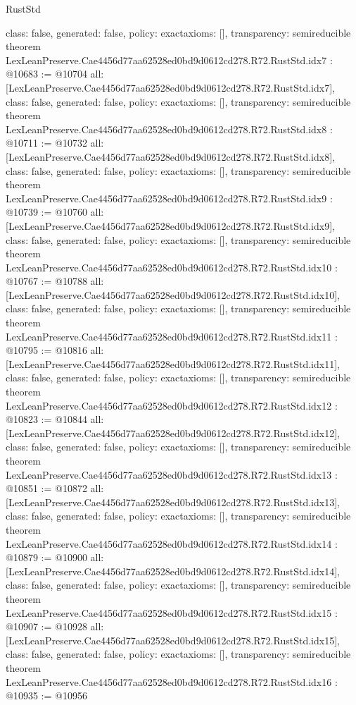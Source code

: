 \begin{lexlean}{RustStd}
\begin{coremodule}
{  class: false,
  generated: false,
  policy: exact{axioms: []},
  transparency: semireducible
}
theorem LexLeanPreserve.Cae4456d77aa62528ed0bd9d0612cd278.R72.RustStd.idx7 : @10683 := @10704 {
  all: [LexLeanPreserve.Cae4456d77aa62528ed0bd9d0612cd278.R72.RustStd.idx7],
  class: false,
  generated: false,
  policy: exact{axioms: []},
  transparency: semireducible
}
theorem LexLeanPreserve.Cae4456d77aa62528ed0bd9d0612cd278.R72.RustStd.idx8 : @10711 := @10732 {
  all: [LexLeanPreserve.Cae4456d77aa62528ed0bd9d0612cd278.R72.RustStd.idx8],
  class: false,
  generated: false,
  policy: exact{axioms: []},
  transparency: semireducible
}
theorem LexLeanPreserve.Cae4456d77aa62528ed0bd9d0612cd278.R72.RustStd.idx9 : @10739 := @10760 {
  all: [LexLeanPreserve.Cae4456d77aa62528ed0bd9d0612cd278.R72.RustStd.idx9],
  class: false,
  generated: false,
  policy: exact{axioms: []},
  transparency: semireducible
}
theorem LexLeanPreserve.Cae4456d77aa62528ed0bd9d0612cd278.R72.RustStd.idx10 : @10767 := @10788 {
  all: [LexLeanPreserve.Cae4456d77aa62528ed0bd9d0612cd278.R72.RustStd.idx10],
  class: false,
  generated: false,
  policy: exact{axioms: []},
  transparency: semireducible
}
theorem LexLeanPreserve.Cae4456d77aa62528ed0bd9d0612cd278.R72.RustStd.idx11 : @10795 := @10816 {
  all: [LexLeanPreserve.Cae4456d77aa62528ed0bd9d0612cd278.R72.RustStd.idx11],
  class: false,
  generated: false,
  policy: exact{axioms: []},
  transparency: semireducible
}
theorem LexLeanPreserve.Cae4456d77aa62528ed0bd9d0612cd278.R72.RustStd.idx12 : @10823 := @10844 {
  all: [LexLeanPreserve.Cae4456d77aa62528ed0bd9d0612cd278.R72.RustStd.idx12],
  class: false,
  generated: false,
  policy: exact{axioms: []},
  transparency: semireducible
}
theorem LexLeanPreserve.Cae4456d77aa62528ed0bd9d0612cd278.R72.RustStd.idx13 : @10851 := @10872 {
  all: [LexLeanPreserve.Cae4456d77aa62528ed0bd9d0612cd278.R72.RustStd.idx13],
  class: false,
  generated: false,
  policy: exact{axioms: []},
  transparency: semireducible
}
theorem LexLeanPreserve.Cae4456d77aa62528ed0bd9d0612cd278.R72.RustStd.idx14 : @10879 := @10900 {
  all: [LexLeanPreserve.Cae4456d77aa62528ed0bd9d0612cd278.R72.RustStd.idx14],
  class: false,
  generated: false,
  policy: exact{axioms: []},
  transparency: semireducible
}
theorem LexLeanPreserve.Cae4456d77aa62528ed0bd9d0612cd278.R72.RustStd.idx15 : @10907 := @10928 {
  all: [LexLeanPreserve.Cae4456d77aa62528ed0bd9d0612cd278.R72.RustStd.idx15],
  class: false,
  generated: false,
  policy: exact{axioms: []},
  transparency: semireducible
}
theorem LexLeanPreserve.Cae4456d77aa62528ed0bd9d0612cd278.R72.RustStd.idx16 : @10935 := @10956 {
}
\end{coremodule}
\end{lexlean}
